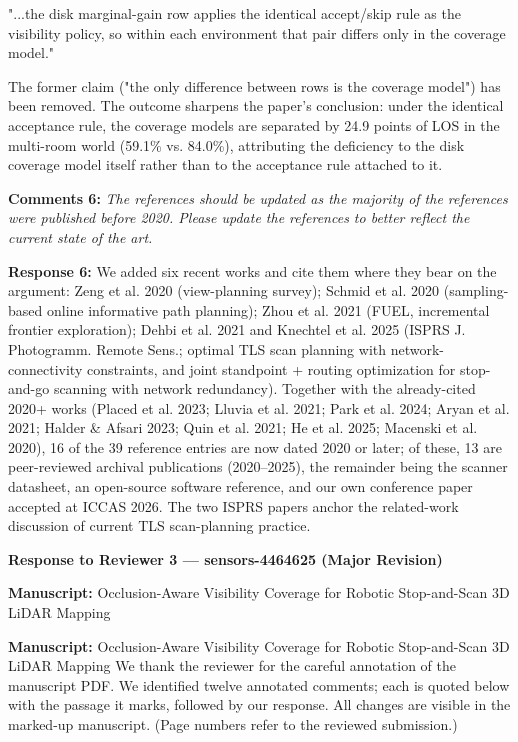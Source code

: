 \documentclass[11pt]{article}
\begin{document}
"...the disk marginal-gain row applies the identical accept/skip rule as the visibility policy, so within each environment that pair differs only in the coverage model."

The former claim ("the only difference between rows is the coverage model") has been removed. The outcome sharpens the paper's conclusion: under the identical acceptance rule, the coverage models are separated by 24.9 points of LOS in the multi-room world (59.1\% vs. 84.0\%), attributing the deficiency to the disk coverage model itself rather than to the acceptance rule attached to it.

\medskip

\textbf{Comments 6:} \emph{\emph{The references should be updated as the majority of the references were published before 2020. Please update the references to better reflect the current state of the art.}}

\textbf{Response 6:} We added six recent works and cite them where they bear on the argument: Zeng et al. 2020 (view-planning survey); Schmid et al. 2020 (sampling-based online informative path planning); Zhou et al. 2021 (FUEL, incremental frontier exploration); Dehbi et al. 2021 and Knechtel et al. 2025 (ISPRS J. Photogramm. Remote Sens.; optimal TLS scan planning with network-connectivity constraints, and joint standpoint + routing optimization for stop-and-go scanning with network redundancy). Together with the already-cited 2020+ works (Placed et al. 2023; Lluvia et al. 2021; Park et al. 2024; Aryan et al. 2021; Halder \& Afsari 2023; Quin et al. 2021; He et al. 2025; Macenski et al. 2020), 16 of the 39 reference entries are now dated 2020 or later; of these, 13 are peer-reviewed archival publications (2020–2025), the remainder being the scanner datasheet, an open-source software reference, and our own conference paper accepted at ICCAS 2026. The two ISPRS papers anchor the related-work discussion of current TLS scan-planning practice.

\medskip

\clearpage
\begin{center}\LARGE\bfseries Response to Reviewer 3 — sensors-4464625 (Major Revision)\end{center}

\textbf{Manuscript:} Occlusion-Aware Visibility Coverage for Robotic Stop-and-Scan 3D LiDAR Mapping

\textbf{Manuscript:} Occlusion-Aware Visibility Coverage for Robotic Stop-and-Scan 3D LiDAR Mapping
We thank the reviewer for the careful annotation of the manuscript PDF. We identified twelve annotated comments; each is quoted below with the passage it marks, followed by our response. All changes are visible in the marked-up manuscript. (Page numbers refer to the reviewed submission.)
\end{document}
